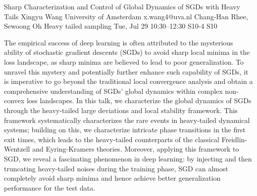 \begin{talk}
  {Sharp Characterization and Control of Global Dynamics of SGDs with Heavy Tails}%
  {Xingyu Wang}%
  {University of Amsterdam}%
  {x.wang4@uva.nl}%
  {Chang-Han Rhee, Sewoong Oh}%
  {Heavy tailed sampling}%
  {Tue, Jul 29 10:30–12:30}%
  {S10-4}%
  {S10}%
				
			
The empirical success of deep learning is often attributed to the mysterious ability of stochastic gradient descents (SGDs) to avoid sharp local minima in the loss landscape, as sharp minima are believed to lead to poor generalization. To unravel this mystery and potentially further enhance such capability of SGDs, it is imperative to go beyond the traditional local convergence analysis and obtain a comprehensive understanding of SGDs' global dynamics within complex non-convex loss landscapes. In this talk, we characterize the global dynamics of SGDs through the heavy-tailed large deviations and local stability framework. This framework systematically characterizes the rare events in heavy-tailed dynamical systems; building on this, we characterize intricate phase transitions in the first exit times, which leads to the heavy-tailed counterparts of the classical Freidlin-Wentzell and Eyring-Kramers theories. Moreover, applying this framework to SGD, we reveal a fascinating phenomenon in deep learning: by injecting and then truncating heavy-tailed noises during the training phase, SGD can almost completely avoid sharp minima and hence achieve better generalization performance for the test data.



\end{talk}


